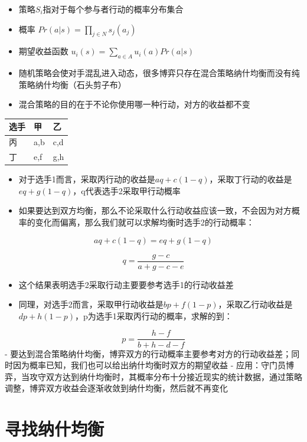 \documentclass[]{book}
\providecommand{\tightlist}{%
  \setlength{\itemsep}{0pt}\setlength{\parskip}{0pt}}
\begin{document}
\begin{itemize}
\tightlist
\item
  策略\(S_i\)指对于每个参与者行动的概率分布集合
\item
  概率 \(Pr(a|s) = \prod_{j \in N}s_j(a_j)\)
\item
  期望收益函数 \(u_i(s) = \sum_{a \in A} u_i(a)Pr(a|s)\)
\item
  随机策略会使对手混乱进入动态，很多博弈只存在混合策略纳什均衡而没有纯策略纳什均衡（石头剪子布）
\item
  混合策略的目的在于不论你使用哪一种行动，对方的收益都不变
\end{itemize}

\begin{longtable}[]{@{}lll@{}}
\toprule
选手 & 甲 & 乙\tabularnewline
\midrule
\endhead
丙 & a,b & c,d\tabularnewline
丁 & e,f & g,h\tabularnewline
\bottomrule
\end{longtable}

\begin{itemize}
\tightlist
\item
  对于选手1而言，采取丙行动的收益是\(aq+c(1-q)\)，采取丁行动的收益是\(eq+g(1-q)\)，q代表选手2采取甲行动概率
\item
  如果要达到双方均衡，那么不论采取什么行动收益应该一致，不会因为对方概率的变化而偏离，那么我们就可以求解均衡时选手2的行动概率：
\end{itemize}

\[aq+c(1-q) = eq+g(1-q)\]

\[q = \frac{g-c}{a+g-c-e}\]

\begin{itemize}
\tightlist
\item
  这个结果表明选手2采取行动主要要参考选手1的行动收益差
\item
  同理，对选手2而言，采取甲行动收益是\(bp+f(1-p)\)，采取乙行动收益是\(dp+h(1-p)\)，p为选手1采取丙行动的概率，求解的到：
\end{itemize}

\[p=\frac{h-f}{b+h-d-f}\]
- 要达到混合策略纳什均衡，博弈双方的行动概率主要参考对方的行动收益差；同时因为概率已知，我们也可以给出纳什均衡时双方的期望收益
- 应用：守门员博弈，当攻守双方达到纳什均衡时，其概率分布十分接近现实的统计数据，通过策略调整，博弈双方收益会逐渐收敛到纳什均衡，然后就不再变化

\hypertarget{ux5bfbux627eux7eb3ux4ec0ux5747ux8861}{%
\section{寻找纳什均衡}\label{ux5bfbux627eux7eb3ux4ec0ux5747ux8861}}
\end{document}
